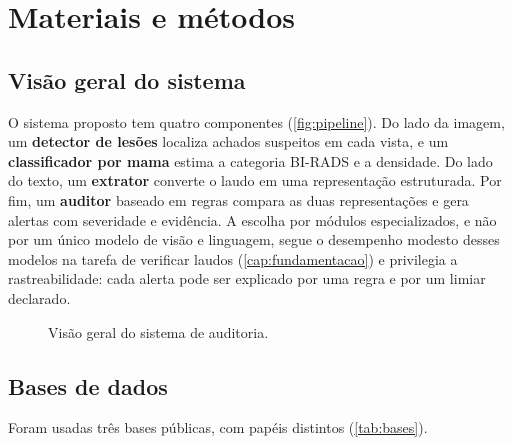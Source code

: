 \chapter{Materiais e métodos}\label{cap:metodologia}

\section{Visão geral do sistema}

O sistema proposto tem quatro componentes (\autoref{fig:pipeline}). Do lado da imagem, um \textbf{detector de lesões} localiza achados suspeitos em cada vista, e um \textbf{classificador por mama} estima a categoria BI-RADS e a densidade. Do lado do texto, um \textbf{extrator} converte o laudo em uma representação estruturada. Por fim, um \textbf{auditor} baseado em regras compara as duas representações e gera alertas com severidade e evidência. A escolha por módulos especializados, e não por um único modelo de visão e linguagem, segue o desempenho modesto desses modelos na tarefa de verificar laudos (\autoref{cap:fundamentacao}) e privilegia a rastreabilidade: cada alerta pode ser explicado por uma regra e por um limiar declarado.

\begin{figure}[htb]
  \centering
  \caption{Visão geral do sistema de auditoria.}
  \label{fig:pipeline}
\end{figure}

\section{Bases de dados}

Foram usadas três bases públicas, com papéis distintos (\autoref{tab:bases}).

